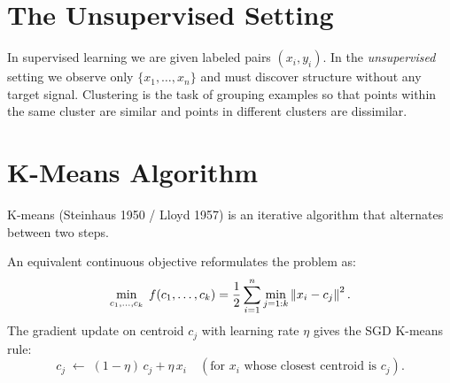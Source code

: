 \documentclass[oneside]{book}
\begin{document}
\section{The Unsupervised Setting}

In supervised learning we are given labeled pairs $(x_i, y_i)$.  In the
\textit{unsupervised} setting we observe only $\{x_1,\dots,x_n\}$ and must
discover structure without any target signal.  Clustering is the task of
grouping examples so that points within the same cluster are similar and
points in different clusters are dissimilar.


\section{K-Means Algorithm}

K-means (Steinhaus 1950 / Lloyd 1957) is an iterative algorithm that
alternates between two steps.


An equivalent continuous objective reformulates the problem as:
\[
    \min_{c_1,\dots,c_k}\; f(c_1,\dots,c_k)
    = \frac{1}{2}\sum_{i=1}^{n} \min_{j=1:k} \left\lVert x_i - c_j \right\rVert^2.
\]
The gradient update on centroid $c_j$ with learning rate $\eta$ gives the
SGD K-means rule:
\[
    c_j \;\leftarrow\; (1-\eta)\,c_j + \eta\,x_i
    \quad (\text{for }x_i\text{ whose closest centroid is }c_j).
\]
\end{document}
